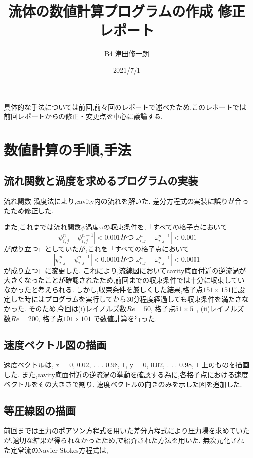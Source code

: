 \documentclass[upLaTeX,a4paper]{jsarticle}
\title{流体の数値計算プログラムの作成 修正レポート}
\author{B4 津田修一朗}
\date{2021/7/1}
\begin{document}
\maketitle

具体的な手法については前回,前々回のレポートで述べたため,このレポートでは前回レポートからの修正・変更点を中心に議論する.

\section{数値計算の手順,手法}
\subsection{流れ関数と渦度を求めるプログラムの実装}
流れ関数-渦度法により,cavity内の流れを解いた.
差分方程式の実装に誤りが合ったため修正した.

また,これまでは流れ関数$\psi$渦度$\omega$の収束条件を,「すべての格子点において
\begin{equation}
  |\psi^n_{i,j}-\psi^{n-1}_{i,j}| < 0.001  かつ  |\omega^n_{i,j}-\omega^{n-1}_{i,j}| < 0.001
\end{equation}
が成り立つ」としていたが,これを「すべての格子点において
\begin{equation}
  |\psi^n_{i,j}-\psi^{n-1}_{i,j}| < 0.0001  かつ  |\omega^n_{i,j}-\omega^{n-1}_{i,j}| < 0.0001
\end{equation}
が成り立つ」に変更した.
これにより,流線図においてcavity底面付近の逆流渦が大きくなったことが確認されたため,前回までの収束条件では十分に収束していなかったと考えられる.
しかし,収束条件を厳しくした結果,格子点$151 × 151$に設定した時にはプログラムを実行してから30分程度経過しても収束条件を満たさなかった.
そのため,今回は(i)レイノルズ数$Re = 50$, 格子点$51\times 51$, (ii)レイノルズ数$Re = 200$, 格子点$101\times 101$
で数値計算を行った.

\subsection{速度ベクトル図の描画}
速度ベクトルは, x = 0, 0.02, . . . 0.98, 1, y = 0, 0.02, . . . 0.98, 1 上のものを描画した.
また,cavity底面付近の逆流渦の挙動を確認する為に,各格子点における速度ベクトルをその大きさで割り,
速度ベクトルの向きのみを示した図を追加した.

\subsection{等圧線図の描画}
前回までは圧力のポアソン方程式を用いた差分方程式により圧力場を求めていたが,適切な結果が得られなかったため,\cite{2}で紹介された方法を用いた.
無次元化された定常流のNavier-Stokes方程式は,
\end{document}

